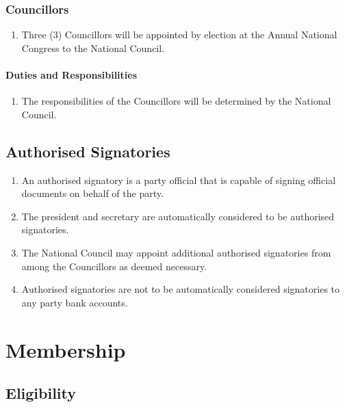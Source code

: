 \documentclass[a4paper,titlepage,8.5pt]{article}
\begin{document}
\subsubsection{Councillors}

\begin{enumerate}
\item Three (3) Councillors will be appointed by election at the Annual National Congress to the National Council.
\end{enumerate}

\paragraph{Duties and Responsibilities}

\begin{enumerate}
\item The responsibilities of the Councillors will be determined by the National Council.
\end{enumerate}

\subsection{Authorised Signatories}

\begin{enumerate}
\item An authorised signatory is a party official that is capable of signing official documents on behalf of the party.
\item The president and secretary are automatically considered to be authorised signatories.
\item The National Council may appoint additional authorised signatories from among the Councillors as deemed necessary.
\item Authorised signatories are not to be automatically considered signatories to any party bank accounts.
\end{enumerate}

\section{Membership}

\subsection{Eligibility}
\end{document}
